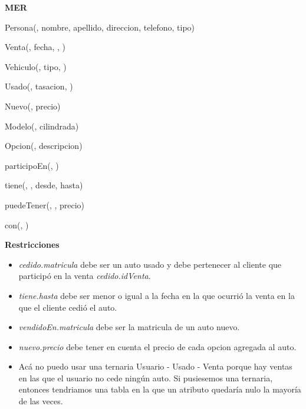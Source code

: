 \begin{multicols}{2}
	\textbf{MER}
	
	\noindent Persona(, nombre, apellido, direccion, telefono, tipo)
	
	\noindent Venta(, fecha, , )
	
	\noindent  Vehiculo(, tipo, )
	
	\noindent Usado(, tasacion, )
	
	\noindent Nuevo(, precio)
	
	\noindent Modelo(, cilindrada)
	
	\noindent Opcion(, descripcion)
	
	\noindent participoEn(, )
	
	\noindent tiene(, , desde, hasta)
	
	\noindent puedeTener(, , precio)
	
	\noindent con(, )
	
	\columnbreak
	\textbf{Restricciones}
	\begin{itemize}
		\item \textit{cedido.matricula} debe ser un auto usado y debe pertenecer al cliente que participó en la venta \textit{cedido.idVenta}. 
		\item \textit{tiene.hasta} debe ser menor o igual a la fecha en la que ocurrió la venta en la que el cliente cedió el auto.
		\item \textit{vendidoEn.matricula} debe ser la matricula de un auto nuevo.
		\item \textit{nuevo.precio} debe tener en cuenta el precio de cada opcion agregada al auto.
	\end{itemize}	
	
	\textbf{}
	\begin{itemize}
		\item Acá no puedo usar una ternaria Usuario - Usado - Venta porque hay ventas en las que el usuario no cede ningún auto. Si pusiesemos una ternaria, entonces tendriamos una tabla en la que un atributo quedaría nulo la mayoría de las veces.
	\end{itemize}
\end{multicols}
